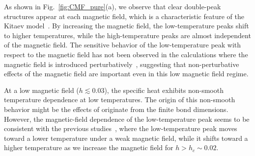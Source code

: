 \documentclass[twocolumn,superscriptaddress,showpacs, longbibliography, aps, prb]{revtex4-2}
\newcommand{\red}[1]{\textcolor{red}{#1}}
\newcommand{\blue}[1]{\textcolor{blue}{#1}}
\newcommand{\orange}[1]{\textcolor{orange}{#1}}
\begin{document}
As shown in Fig.~\ref{fig:CMF_pure}(a),
we %
observe that clear double-peak structures %
appear at each magnetic field, which is a characteristic %
feature of the Kitaev model~\cite{NasuUM2014,NasuUM2015}.
By increasing the magnetic field, %
the low-temperature peaks %
shift to higher temperatures, while the high-temperature peaks are almost independent of the magnetic field. 
The sensitive behavior of the low-temperature peak with respect to the magnetic field has not been observed in the calculations where the magnetic field is introduced perturbatively~\cite{NasuYM2017}, suggesting that non-perturbative effects of the magnetic field are important even in this low magnetic field regime.


At a low magnetic field ($h\lesssim 0.03$), 
the specific heat exhibits non-smooth temperature dependence at low temperatures. The origin of this non-smooth behavior might be the effects of originate from the finite bond dimensions. However, the magnetic-field dependence of the low-temperature peak seems to be consistent with the %
previous studies~\cite{YoshitakeNKM2020,LiZWWGQLGL2021,LiLXGQLS2024}, where the low-temperature peak moves toward a lower temperature %
under a weak magnetic field, while it %
shifts toward a higher temperature as we increase the %
magnetic field for $h > h_c \sim 0.02$.
\end{document}
